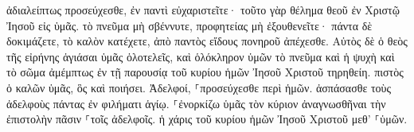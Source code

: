 \documentclass{openreader}
\begin{document}
ἀδιαλείπτως προσεύχεσθε, 
ἐν παντὶ εὐχαριστεῖτε· τοῦτο γὰρ θέλημα θεοῦ ἐν Χριστῷ Ἰησοῦ εἰς ὑμᾶς. 
τὸ πνεῦμα μὴ σβέννυτε, 
προφητείας μὴ ἐξουθενεῖτε· 
πάντα δὲ δοκιμάζετε, τὸ καλὸν κατέχετε, 
ἀπὸ παντὸς εἴδους πονηροῦ ἀπέχεσθε. 
Αὐτὸς δὲ ὁ θεὸς τῆς εἰρήνης ἁγιάσαι ὑμᾶς ὁλοτελεῖς, καὶ ὁλόκληρον ὑμῶν τὸ πνεῦμα καὶ ἡ ψυχὴ καὶ τὸ σῶμα ἀμέμπτως ἐν τῇ παρουσίᾳ τοῦ κυρίου ἡμῶν Ἰησοῦ Χριστοῦ τηρηθείη. 
πιστὸς ὁ καλῶν ὑμᾶς, ὃς καὶ ποιήσει. 
Ἀδελφοί, ⸀προσεύχεσθε περὶ ἡμῶν. 
ἀσπάσασθε τοὺς ἀδελφοὺς πάντας ἐν φιλήματι ἁγίῳ. 
⸀ἐνορκίζω ὑμᾶς τὸν κύριον ἀναγνωσθῆναι τὴν ἐπιστολὴν πᾶσιν ⸀τοῖς ἀδελφοῖς. 
ἡ χάρις τοῦ κυρίου ἡμῶν Ἰησοῦ Χριστοῦ μεθ’ ⸀ὑμῶν. 
\end{document}
